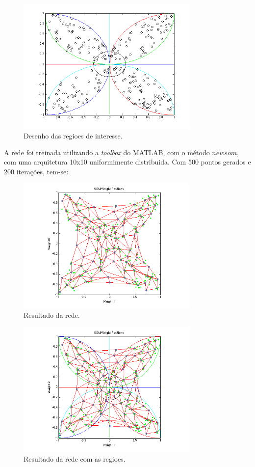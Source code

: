 \documentclass[a4paper,oneside,12pt]{article}
\begin{document}
\begin{enumerate}[1.]
\begin{figure}
\centering
\includegraphics[width=0.8\textwidth]{q8_1.png}
\caption{Desenho das regioes de interesse.}
\label{fig:q8_1}
\end{figure}

A rede foi treinada utilizando a \emph{toolbox} do MATLAB, com o m\'etodo $newsom$, com uma arquitetura 10x10 uniformimente distribuida. Com 500 pontos gerados e 200 itera\c{c}\~oes, tem-se:

\begin{figure}
\centering
\includegraphics[width=0.8\textwidth]{q8_2.png}
\caption{Resultado da rede.}
\label{fig:q8_2}
\end{figure}

\begin{figure}
\centering
\includegraphics[width=0.8\textwidth]{q8_3.png}
\caption{Resultado da rede com as regioes.}
\label{fig:q8_3}
\end{figure}


\end{enumerate}
\end{document}
